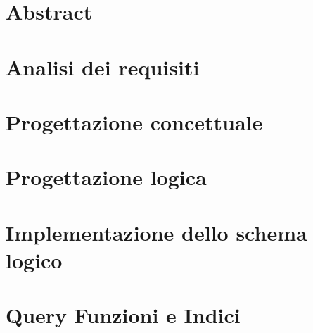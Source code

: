 \documentclass[a4paper,10pt]{report}
\begin{document}
    \tableofcontents

	\chapter{Abstract}
    
    
    \chapter{Analisi dei requisiti}
        

    \chapter{Progettazione concettuale}
        

    \chapter{Progettazione logica}
        

    \chapter{Implementazione dello schema logico}
        

    \chapter{Query Funzioni e Indici}
        
\end{document}
